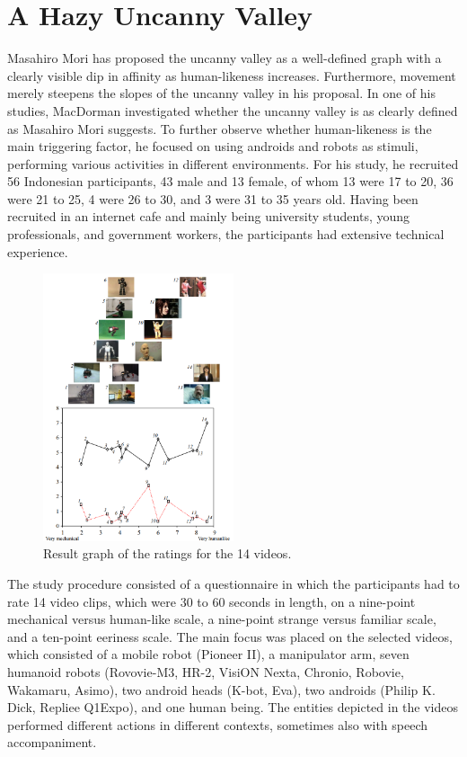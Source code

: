 \section{A Hazy Uncanny Valley}
Masahiro Mori has proposed the uncanny valley as a well-defined graph with a clearly visible dip in affinity as human-likeness increases. Furthermore, movement merely steepens the slopes of the uncanny valley in his proposal.
In one of his studies, MacDorman \cite{uncanny_ambiguous} investigated whether the uncanny valley is as clearly defined as Masahiro Mori suggests. To further observe whether human-likeness is the main triggering factor, he focused on using androids and robots as stimuli, performing various activities in different environments. For his study, he recruited 56 Indonesian participants, 43 male and 13 female, of whom 13 were 17 to 20, 36 were 21 to 25, 4 were 26 to 30, and 3 were 31 to 35  years old. Having been recruited in an internet cafe and mainly being university students, young professionals, and government workers, the participants had extensive technical experience.\newpage
\begin{figure} %
    \centering
    \includegraphics[width=0.5\textwidth]{graphics/hazy_uncanny.png}
    \caption{Result graph of the ratings for the 14 videos.}
    \label{fig:hazyUncanny}
\end{figure}
The study procedure consisted of a questionnaire in which the participants had to rate 14 video clips, which were 30 to 60 seconds in length, on a nine-point mechanical versus human-like scale, a nine-point strange versus familiar scale, and a ten-point eeriness scale. The main focus was placed on the selected videos, which consisted of a mobile robot (Pioneer II), a manipulator arm, seven humanoid robots (Rovovie-M3, HR-2, VisiON Nexta, Chronio, Robovie, Wakamaru, Asimo), two android heads (K-bot, Eva), two androids (Philip K. Dick, Repliee Q1Expo), and one human being. The entities depicted in the videos performed different actions in different contexts, sometimes also with speech accompaniment.\\
